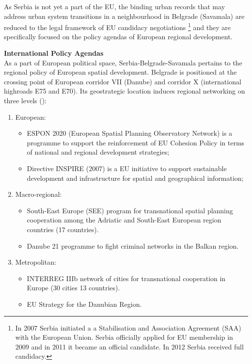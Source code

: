 \documentclass[11pt]{report}
\begin{document}
{{{{As Serbia is not yet a part of the EU, the binding urban records that may address urban system transitions in a neighbourhood in Belgrade (Savamala) are reduced to the legal framework of EU candidacy negotiations
\footnote{In 2007 Serbia initiated a a Stabilisation and Association Agreement (SAA) with the European Union. Serbia officially applied for EU membership in 2009 and in 2011 it became an official candidate. In 2012 Serbia received full candidacy.}
and they are specifically focused on the policy agendas of European regional development.

\textbf{International Policy Agendas}
\\
As a part of European political space, Serbia-Belgrade-Savamala pertains to the regional policy of European spatial development. Belgrade is positioned at the crossing point of European corridor VII (Danube) and corridor X (international highroads E75 and E70). Its geostrategic location induces regional networking on three levels (\href{Stuper}{\citealt{stupar_aleksandra_recreating_2004}}):

\begin{enumerate}
\item European:

\begin{itemize}
\item ESPON 2020 (European Spatial Planning Observatory Network) is a programme to support the reinforcement of EU Cohesion Policy in terms of national and regional development strategies;
\item Directive INSPIRE (2007) is a EU initiative to support sustainable development and infrastructure for spatial and geographical information; 
\end{itemize}

\item Macro-regional:

\begin{itemize}
\item South-East Europe (SEE) program for transnational spatial planning cooperation among the Adriatic and South-East European region countries (17 countries).
\item Danube 21 programme to fight criminal networks in the Balkan region.
\end{itemize}

\item Metropolitan:

\begin{itemize}
\item INTERREG IIIb network of cities for transnational cooperation in Europe (30 cities 13 countries).
\item EU Strategy for the Danubian Region.
\end{itemize}
\end{enumerate}

}}}}
\end{document}
